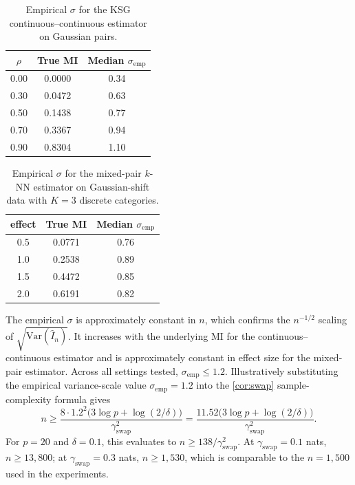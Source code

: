 \begin{table}[ht]
\centering
\caption{Empirical $\sigma$ for the KSG continuous--continuous
estimator on Gaussian pairs.}
\label{tab:sigma_cc}
\begin{tabular}{ccc}
\toprule
$\rho$ & True MI & Median $\sigma_{\mathrm{emp}}$ \\
\midrule
0.00 & 0.0000 & 0.34 \\
0.30 & 0.0472 & 0.63 \\
0.50 & 0.1438 & 0.77 \\
0.70 & 0.3367 & 0.94 \\
0.90 & 0.8304 & 1.10 \\
\bottomrule
\end{tabular}
\end{table}

\begin{table}[ht]
\centering
\caption{Empirical $\sigma$ for the mixed-pair $k$-NN estimator on
Gaussian-shift data with $K = 3$ discrete categories.}
\label{tab:sigma_cd}
\begin{tabular}{ccc}
\toprule
effect & True MI & Median $\sigma_{\mathrm{emp}}$ \\
\midrule
0.5 & 0.0771 & 0.76 \\
1.0 & 0.2538 & 0.89 \\
1.5 & 0.4472 & 0.85 \\
2.0 & 0.6191 & 0.82 \\
\bottomrule
\end{tabular}
\end{table}

The empirical $\sigma$ is approximately constant in $n$, which
confirms the $n^{-1/2}$ scaling of
$\sqrt{\mathrm{Var}(\hat{I}_n)}$. It increases with the underlying MI
for the continuous--continuous estimator and is approximately constant
in effect size for the mixed-pair estimator. Across all settings tested, $\sigma_{\mathrm{emp}} \le 1.2$.
Illustratively substituting the empirical variance-scale value
$\sigma_{\mathrm{emp}} = 1.2$ into the \cref{cor:swap}
sample-complexity formula gives
\begin{equation}
n \ge \frac{8 \cdot 1.2^2 \bigl(3 \log p + \log(2/\delta)\bigr)}{
\gamma_{\mathrm{swap}}^2}
= \frac{11.52 \bigl(3 \log p + \log(2/\delta)\bigr)}{\gamma_{\mathrm{swap}}^2}.
\end{equation}
For $p = 20$ and $\delta = 0.1$, this evaluates to
$n \ge 138 / \gamma_{\mathrm{swap}}^2$. At
$\gamma_{\mathrm{swap}} = 0.1$ nats, $n \ge 13{,}800$; at
$\gamma_{\mathrm{swap}} = 0.3$ nats, $n \ge 1{,}530$, which is
comparable to the $n = 1{,}500$ used in the experiments.

